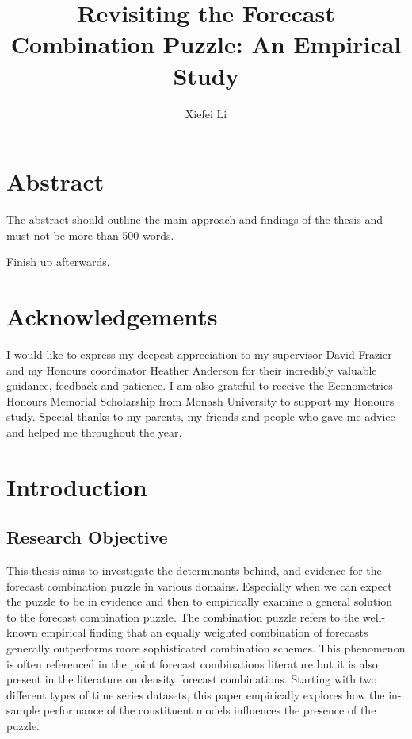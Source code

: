 \documentclass{monashthesis}
\author{Xiefei Li}
\title{Revisiting the Forecast Combination Puzzle: An Empirical Study}
\begin{document}

\titlepage

{\sf\tighttoc\doublespacing}

\clearpage{}\setcounter{page}{1}

\hypertarget{abstract}{%
\chapter*{Abstract}\label{abstract}}

The abstract should outline the main approach and findings of the thesis and must not be more than 500 words.

Finish up afterwards.

\newpage

\hypertarget{acknowledgements}{%
\chapter*{Acknowledgements}\label{acknowledgements}}

I would like to express my deepest appreciation to my supervisor David Frazier and my Honours coordinator Heather Anderson for their incredibly valuable guidance, feedback and patience. I am also grateful to receive the Econometrics Honours Memorial Scholarship from Monash University to support my Honours study. Special thanks to my parents, my friends and people who gave me advice and helped me throughout the year.

\hypertarget{introduction}{%
\chapter{Introduction}\label{introduction}}

\hypertarget{research-objective}{%
\section{Research Objective}\label{research-objective}}

This thesis aims to investigate the determinants behind, and evidence for the forecast combination puzzle in various domains. Especially when we can expect the puzzle to be in evidence and then to empirically examine a general solution to the forecast combination puzzle. The combination puzzle refers to the well-known empirical finding that an equally weighted combination of forecasts generally outperforms more sophisticated combination schemes. This phenomenon is often referenced in the point forecast combinations literature but it is also present in the literature on density forecast combinations. Starting with two different types of time series datasets, this paper empirically explores how the in-sample performance of the constituent models influences the presence of the puzzle.
\end{document}
